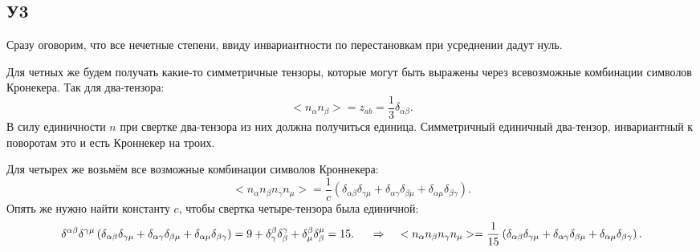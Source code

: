 \subsection*{У3}
Сразу оговорим, что все нечетные степени, ввиду инвариантности по перестановкам при усреднении дадут нуль.

Для четных же будем получать какие-то симметричные тензоры, которые могут быть выражены через всевозможные комбинации символов Кронекера. Так для два-тензора:
\begin{equation*}
	< n_\alpha n_\beta> = z_{a b} = \frac{1}{3} \delta_{\alpha \beta}.
\end{equation*}
В силу единичности $n$ при свертке два-тензора из них должна получиться единица. Симметричный единичный два-тензор, инвариантный к поворотам это и есть Кроннекер на троих.

Для четырех же возьмём все возможные комбинации символов Кроннекера:
\begin{equation*}
	<n_\alpha n_\beta n_\gamma n_\mu> = \frac{1}{c} 
	\left(
	\delta_{\alpha \beta} \delta_{\gamma \mu} + \delta_{\alpha \gamma} \delta_{\beta \mu} + \delta_{\alpha \mu} \delta_{\beta \gamma}
	\right).
\end{equation*}
Опять же нужно найти константу $c$, чтобы свертка четыре-тензора была единичной:
\begin{equation*}
	\delta^{\alpha \beta} \delta^{\gamma \mu}\left(
	\delta_{\alpha \beta} \delta_{\gamma \mu} + \delta_{\alpha \gamma} \delta_{\beta \mu} + \delta_{\alpha \mu} \delta_{\beta \gamma}
	\right) = 9 + \delta_{\gamma}^{\beta} \delta_{\beta}^{\gamma}  + \delta_{\mu}^{\beta} \delta_{\beta}^{\mu} = 15.
	\hspace{0.5 cm}
	 \Rightarrow
	 \hspace{0.5 cm}
	 <n_\alpha n_\beta n_\gamma n_\mu> = \frac{1}{15} 
	\left(
	\delta_{\alpha \beta} \delta_{\gamma \mu} + \delta_{\alpha \gamma} \delta_{\beta \mu} + \delta_{\alpha \mu} \delta_{\beta \gamma}
	\right).
\end{equation*}